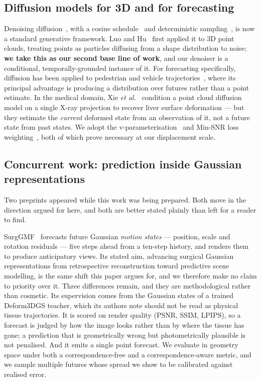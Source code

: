 \documentclass[conference]{IEEEtran}
\begin{document}
\subsection{Diffusion models for 3D and for forecasting}
Denoising diffusion~\cite{ho2020ddpm}, with a cosine
schedule~\cite{nichol2021improved} and deterministic sampling~\cite{song2021ddim},
is now a standard generative framework. Luo and Hu~\cite{luo2021diffusionpc} first
applied it to 3D point clouds, treating points as particles diffusing from a shape
distribution to noise; \textbf{we take this as our second base line of work}, and
our denoiser is a conditional, temporally-grounded instance of it. For forecasting
specifically, diffusion has been applied to pedestrian and vehicle
trajectories~\cite{mao2023leapfrog,bae2024singulartrajectory}, where its principal
advantage is producing a distribution over futures rather than a point estimate.
In the medical domain, Xie \textit{et al.}~\cite{xie2025liverdiffusion} condition a
point cloud diffusion model on a single X-ray projection to recover liver surface
deformation --- but they estimate the \emph{current} deformed state from an
observation of it, not a future state from past states. We adopt the
v-parameterisation~\cite{salimans2022progressive} and Min-SNR loss
weighting~\cite{hang2023minsnr}, both of which prove necessary at our displacement
scale.

\subsection{Concurrent work: prediction inside Gaussian representations}
Two preprints appeared while this work was being prepared. Both move in the direction
argued for here, and both are better stated plainly than left for a reader to find.

SurgGMF~\cite{surggmf2026} forecasts future Gaussian \emph{motion states} --- position,
scale and rotation residuals --- five steps ahead from a ten-step history, and renders
them to produce anticipatory views. Its stated aim, advancing surgical Gaussian
representations from retrospective reconstruction toward predictive scene modelling, is
the same shift this paper argues for, and we therefore make no claim to priority over it.
Three differences remain, and they are methodological rather than cosmetic. Its
supervision comes from the Gaussian states of a trained Deform3DGS teacher, which its
authors note should not be read as physical tissue trajectories. It is scored on render
quality (PSNR, SSIM, LPIPS), so a forecast is judged by how the image looks rather than by
where the tissue has gone; a prediction that is geometrically wrong but photometrically
plausible is not penalised. And it emits a single point forecast. We evaluate in geometry
space under both a correspondence-free and a correspondence-aware metric, and we sample
multiple futures whose spread we show to be calibrated against realised error.
\end{document}
